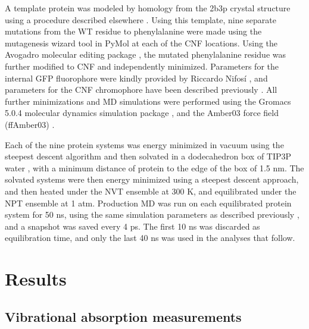 A template protein was modeled by homology from the 2b3p crystal structure\cite{Pedelacq2006} using a procedure described elsewhere \cite{Slocum2017}.
Using this template, nine separate mutations from the WT residue to phenylalanine were made using the mutagenesis wizard tool in PyMol\cite{DeLano2002} at each of the CNF locations.
Using the Avogadro molecular editing package \cite{Hanwell2012}, the mutated phenylalanine residue was further modified to CNF and independently minimized.
Parameters for the internal GFP fluorophore were kindly provided by Riccardo Nifos\'i \cite{Nifosi2003}, and parameters for the CNF chromophore have been described previously \cite{Slocum2017}.
All further minimizations and MD simulations were performed using the Gromacs 5.0.4 molecular dynamics simulation package \cite{VanDerSpoel2005, Abraham2015}, and the Amber03 force field (ffAmber03) \cite{Duan2003, Sorin2005}. 

Each of the nine protein systems was energy minimized in vacuum using the steepest descent algorithm and then solvated in a dodecahedron box of TIP3P water \cite{Jorgensen1983}, with a minimum distance of protein to the edge of the box of 1.5 nm.
The solvated systems were then energy minimized using a steepest descent approach, and then heated under the NVT ensemble at 300 K, and equilibrated under the NPT ensemble at 1 atm.
Production MD was run on each equilibrated protein system for 50 ns, using the same simulation parameters as described previously \cite{Slocum2017}, and a snapshot was saved every 4 ps.
The first 10 ns was discarded as equilibration time, and only the last 40 ns was used in the analyses that follow.

\section{Results}
\subsection{Vibrational absorption measurements}

